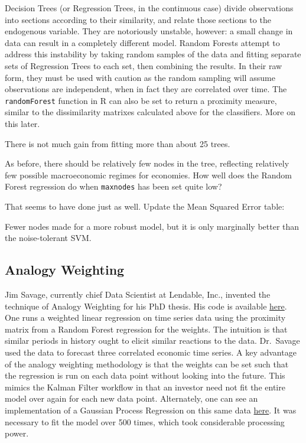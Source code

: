 \documentclass[]{article}
\begin{document}
Decision Trees (or Regression Trees, in the continuous case) divide
observations into sections according to their similarity, and relate
those sections to the endogenous variable. They are notoriously
unstable, however: a small change in data can result in a completely
different model. Random Forests attempt to address this instability by
taking random samples of the data and fitting separate sets of
Regression Trees to each set, then combining the results. In their raw
form, they must be used with caution as the random sampling will assume
observations are independent, when in fact they are correlated over
time. The \texttt{randomForest} function in R can also be set to return
a proximity measure, similar to the dissimilarity matrixes calculated
above for the classifiers. More on this later.

There is not much gain from fitting more than about 25 trees.

As before, there should be relatively few nodes in the tree, reflecting
relatively few possible macroeconomic regimes for economies. How well
does the Random Forest regression do when \texttt{maxnodes} has been set
quite low?

That seems to have done just as well. Update the Mean Squared Error
table:

Fewer nodes made for a more robust model, but it is only marginally
better than the noise-tolerant SVM.

\subsection{Analogy Weighting}\label{analogy-weighting}

Jim Savage, currently chief Data Scientist at Lendable, Inc., invented
the technique of Analogy Weighting for his PhD thesis. His code is
available \href{https://github.com/khakieconomics/Thesis_work}{here}.
One runs a weighted linear regression on time series data using the
proximity matrix from a Random Forest regression for the weights. The
intuition is that similar periods in history ought to elicit similar
reactions to the data. Dr.~Savage used the data to forecast three
correlated economic time series. A key advantage of the analogy
weighting methodology is that the weights can be set such that the
regression is run on each data point without looking into the future.
This mimics the Kalman Filter workflow in that an investor need not fit
the entire model over again for each new data point. Alternately, one
can see an implementation of a Gaussian Process Regression on this same
data \href{https://charlesnaylor.github.io/gp_regression/}{here}. It was
necessary to fit the model over 500 times, which took considerable
processing power.
\end{document}
